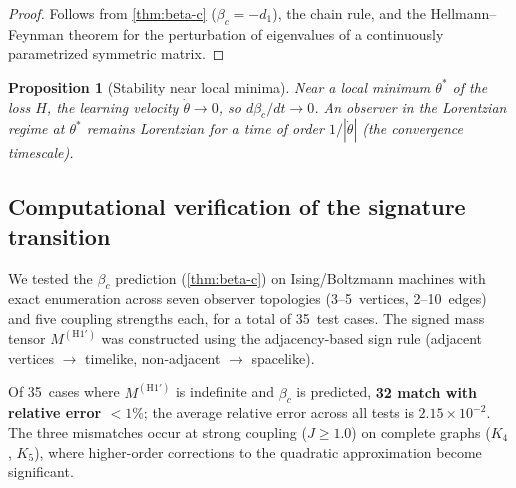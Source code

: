 \documentclass[11pt]{article}
\newtheorem{proposition}[theorem]{Proposition}
\theoremstyle{definition}
\theoremstyle{remark}
\begin{document}
\begin{proof}
Follows from \cref{thm:beta-c} ($\beta_c = -d_1$), the chain rule, and
the Hellmann--Feynman theorem for the perturbation of eigenvalues of a
continuously parametrized symmetric matrix.
\end{proof}

\begin{proposition}[Stability near local minima]
\label{prop:stability}
Near a local minimum $\theta^*$ of the loss $H$, the learning velocity
$\dot{\theta} \to 0$, so $d\beta_c/dt \to 0$.
An observer in the Lorentzian regime at $\theta^*$ remains Lorentzian for
a time of order $1 / |\dot{\theta}|$ (the convergence timescale).
\end{proposition}

\subsection{Computational verification of the signature transition}
\label{sec:computational-verification}

We tested the $\beta_c$ prediction (\cref{thm:beta-c}) on Ising/Boltzmann
machines with exact enumeration across seven observer topologies
(3--5~vertices, 2--10~edges) and five coupling strengths each, for a
total of 35~test cases.
The signed mass tensor $M^{(\mathrm{H1'})}$ was constructed using the
adjacency-based sign rule (adjacent vertices $\to$ timelike,
non-adjacent $\to$ spacelike).

Of 35~cases where $M^{(\mathrm{H1'})}$ is indefinite and $\beta_c$ is
predicted, \textbf{32 match with relative error $< 1\%$}; the
average relative error across all tests is $2.15 \times 10^{-2}$.
The three mismatches occur at strong coupling ($J \geq 1.0$) on
complete graphs ($K_4$, $K_5$), where higher-order corrections to the
quadratic approximation become significant.
\end{document}
